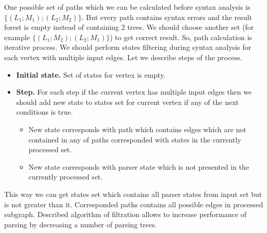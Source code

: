 One possible set of paths which we can be calculated before syntax analysis is $\{(L_1; M_1); (L_2; M_2)\}$. 
But every path contains syntax errors and the result forest is empty instead of containing 2 trees. 
We should choose another set (for example $\{(L_1; M_2); (L_2; M_1)\}$) to get correct result. So, 
path calculation is iterative process. We should perform states filtering during syntax analysis 
for each vertex with multiple input edges. Let we describe steps of the process.

\begin{itemize}
    \item \textbf{Initial state.} Set of states for vertex is empty. 
    \item \textbf{Step.} For each step if the current vertex has multiple input edges then we should add new state to states set for current vertex if any of the next conditions is true.
    \begin{itemize}
        \item New state corresponds with path which contains edges which are not contained in any of paths corresponded with states in the currently processed set. 
        \item New state corresponds with parser state which is not presented in the currently processed set.
    \end{itemize}

\end{itemize}

This way we can get states set which contains all parser states from input set but is not greater 
than it. Corresponded paths contains all possible edges in processed subgraph. Described algorithm
of filtration allows to increase performance of parsing by decreasing a number of parsing trees.
